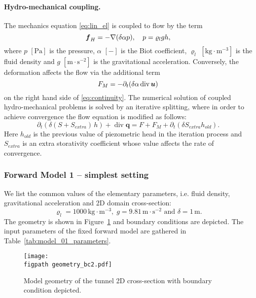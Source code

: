\documentclass{article}
\def\unit#1{\mathrm{#1}}
\def\bunit#1{[\mathrm{#1}]}
\def\div{\operatorname{div}}
\def\vc#1{\mathbf{\boldsymbol{#1}}}     %
\def\uu{\vc u}
\def\nn{\vc n}
\newcommand{\figpath}{figs/}
\newcommand{\eq}[1]{\begin{equation}{#1}\end{equation}}
\newcommand\figref[1]{Figure~\ref{#1}}
\newcommand\tabref[1]{Table~\ref{#1}}
\begin{document}
\paragraph{Hydro-mechanical coupling.}
The mechanics equation \eqref{eq:lin_el} is coupled to flow by the term
\eq{ \label{eq:mech_fluid_source} \vc f_H = -\nabla(\delta\alpha p), \quad p = \varrho_l g h, }
where $p$ $\bunit{Pa}$ is the pressure, $\alpha$ $\bunit{-}$ is the Biot coefficient, $\varrho_l$ $\bunit{kg\cdot m^{-3}}$ is the fluid density and $g$ $\bunit{m\cdot s^{-2}}$ is the gravitational acceleration.
Conversely, the deformation affects the flow via the additional term
\eq{ \label{eq:fluid_source_div_u} F_M = -\partial_t(\delta\alpha\div\uu) }
on the right hand side of \eqref{eq:continuity}.
The numerical solution of coupled hydro-mechanical problems is solved by an iterative splitting, where in order to achieve convergence the flow equation is modified as follows:
\eq{ \partial_t(\delta(S+S_{extra})\,h) + \div\vc q = F + F_M + \partial_t(\delta S_{extra} h_{old}). }
Here $h_{old}$ is the previous value of piezometric head in the iteration process and $S_{extra}$ is an extra storativity coefficient whose value affects the rate of convergence.

\subsubsection{Forward Model 1 -- simplest setting}
\label{sec:model_01}
We list the common values of the elementary parameters, i.e. fluid density, gravitational acceleration and 2D domain cross-section: 
\[\varrho_l=1000\,\unit{kg\cdot m^{-3}},\; g=9.81\,\unit{m\cdot s^{-2}} \mbox{ and } \delta=1\,\unit{m}.\]
The geometry is shown in \figref{fig:model_01_geometry} and boundary conditions are depicted.
The input parameters of the fixed forward model are gathered in \tabref{tab:model_01_parameters}.

\begin{figure}[!htb]
    \centering
    \texttt{[image: \\figpath geometry\_bc2.pdf]}
    \caption{Model geometry of the tunnel 2D cross-section with boundary condition depicted.}
    \label{fig:model_01_geometry}
\end{figure}
\end{document}
